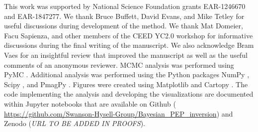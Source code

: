 \documentclass[]{agujournal2019}
\begin{document}
\acknowledgments
This work was supported by National Science Foundation grants EAR-1246670 and EAR-1847277. We thank Bruce Buffett, David Evans, and Mike Tetley for useful discussions during development of the method. We thank Mat Domeier, Facu Sapienza, and other members of the CEED YC2.0 workshop for informative discussions during the final writing of the manuscript. We also acknowledge Bram Vaes for an insightful review that improved the manuscript as well as the useful comments of an anonymous reviewer. MCMC analysis was performed using PyMC \cite{Salvatier2016a}. Additional analysis was performed using the Python packages NumPy \cite{Harris2020a}, Scipy \cite{Virtanen2020a}, and PmagPy \cite{Tauxe2016a}. Figures were created using Matplotlib \cite{Hunter2007a} and Cartopy \cite{Met-Office2010a}. The code implementing the analysis and developing the visualizations are documented within Jupyter notebooks \cite{Kluyver2016a} that are available on Github ( \url{https://github.com/Swanson-Hysell-Group/Bayesian_PEP_inversion}) and Zenodo (\textit{URL TO BE ADDED IN PROOFS}).
\clearpage




%


%


\end{document}
